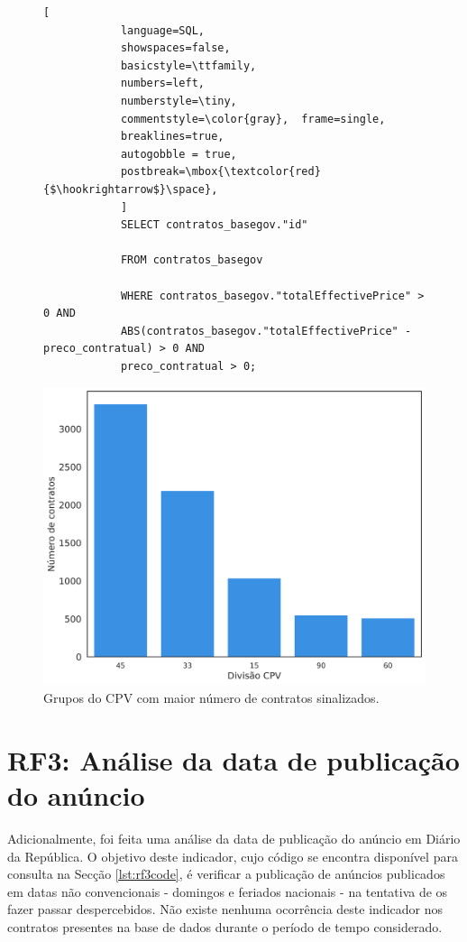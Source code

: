 \begin{figure}[H]
	\centering
	\begin{minipage}{.45\linewidth}
		\begin{lstlisting}[
			language=SQL,
			showspaces=false,
			basicstyle=\ttfamily,
			numbers=left,
			numberstyle=\tiny,
			commentstyle=\color{gray},	frame=single,
			breaklines=true,
			autogobble = true,
			postbreak=\mbox{\textcolor{red}{$\hookrightarrow$}\space},
			]
			SELECT contratos_basegov."id"
			
			FROM contratos_basegov 
			
			WHERE contratos_basegov."totalEffectivePrice" > 0 AND 
			ABS(contratos_basegov."totalEffectivePrice" - preco_contratual) > 0 AND 
			preco_contratual > 0;
		\end{lstlisting}
	\end{minipage}
	\hfill
	\begin{minipage}{.4\linewidth}
		\centering
		\includegraphics[width=\textwidth]{imagens/rf2/main_cpvs.png}
		\caption{Grupos do CPV com maior número de contratos sinalizados.}
		\label{}
	\end{minipage}
\end{figure}


\section{RF3: Análise da data de publicação do anúncio}

Adicionalmente, foi feita uma análise da data de publicação do anúncio em Diário da República. O objetivo deste indicador, cujo código se encontra disponível para consulta na Secção \ref{lst:rf3code}, é verificar a publicação de anúncios publicados em datas não convencionais - domingos e feriados nacionais - na tentativa de os fazer passar despercebidos. Não existe nenhuma ocorrência deste indicador nos contratos presentes na base de dados durante o período de tempo considerado. 



